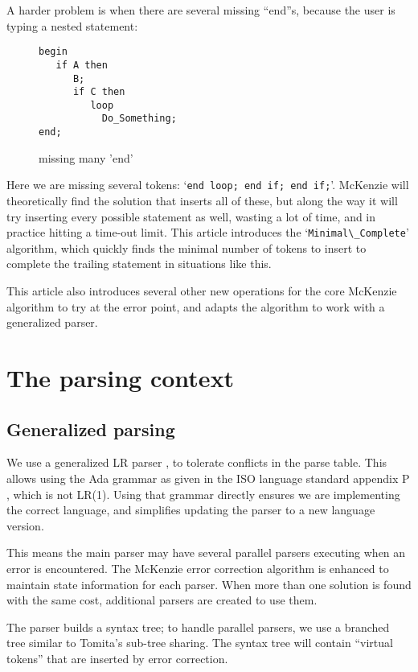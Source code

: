 \documentclass{article}
\newcommand{\code}[1]{`\lstinline|#1|'}
\begin{document}
A harder problem is when there are several missing ``end''s, because
the user is typing a nested statement:
\begin{figure}[H]
\begin{lstlisting}
begin
   if A then
      B;
      if C then
         loop
           Do_Something;
end;
\end{lstlisting}
\caption{missing many 'end'}
\label{ex:min_com_if_if_loop}
\end{figure}

Here we are missing several tokens: \code{end loop; end if; end if;}.
McKenzie will theoretically find the solution that inserts all of
these, but along the way it will try inserting every possible
statement as well, wasting a lot of time, and in practice hitting a
time-out limit. This article introduces the \code{Minimal\_Complete}
algorithm, which quickly finds the minimal number of tokens to insert
to complete the trailing statement in situations like this.

This article also introduces several other new operations for the core
McKenzie algorithm to try at the error point, and adapts the algorithm
to work with a generalized parser.


\section{The parsing context}
\subsection{Generalized parsing}
We use a generalized LR parser \cite{Tomita 1986}, to tolerate
conflicts in the parse table. This allows using the Ada grammar as
given in the ISO language standard appendix P \cite{Ada 2012}, which
is not LR(1). Using that grammar directly ensures we are implementing
the correct language, and simplifies updating the parser to a new
language version.

This means the main parser may have several parallel parsers executing
when an error is encountered. The McKenzie error correction algorithm
is enhanced to maintain state information for each parser. When more
than one solution is found with the same cost, additional parsers are
created to use them.

The parser builds a syntax tree; to handle parallel parsers, we use a
branched tree similar to Tomita's sub-tree sharing. The syntax tree
will contain ``virtual tokens'' that are inserted by error correction.
\end{document}
